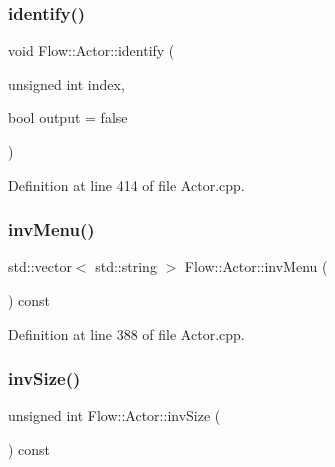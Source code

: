\hypertarget{class_flow_1_1_actor_ae4cb3aadfe983b6bee09b27649dbb704}{}\label{class_flow_1_1_actor_ae4cb3aadfe983b6bee09b27649dbb704} 
\subsubsection{\texorpdfstring{identify()}{identify()}}
{\footnotesize\ttfamily void Flow\+::\+Actor\+::identify (\begin{DoxyParamCaption}\item[{unsigned int}]{index,  }\item[{bool}]{output = {\ttfamily false} }\end{DoxyParamCaption})}



Definition at line 414 of file Actor.\+cpp.

\hypertarget{class_flow_1_1_actor_aec57f78aa7e423c35b6b8addbe0aa46f}{}\label{class_flow_1_1_actor_aec57f78aa7e423c35b6b8addbe0aa46f} 
\subsubsection{\texorpdfstring{inv\+Menu()}{invMenu()}}
{\footnotesize\ttfamily std\+::vector$<$ std\+::string $>$ Flow\+::\+Actor\+::inv\+Menu (\begin{DoxyParamCaption}{ }\end{DoxyParamCaption}) const}



Definition at line 388 of file Actor.\+cpp.

\hypertarget{class_flow_1_1_actor_a21e03a4d2284091fe232dfe2cc7cbf47}{}\label{class_flow_1_1_actor_a21e03a4d2284091fe232dfe2cc7cbf47} 
\subsubsection{\texorpdfstring{inv\+Size()}{invSize()}}
{\footnotesize\ttfamily unsigned int Flow\+::\+Actor\+::inv\+Size (\begin{DoxyParamCaption}{ }\end{DoxyParamCaption}) const}



